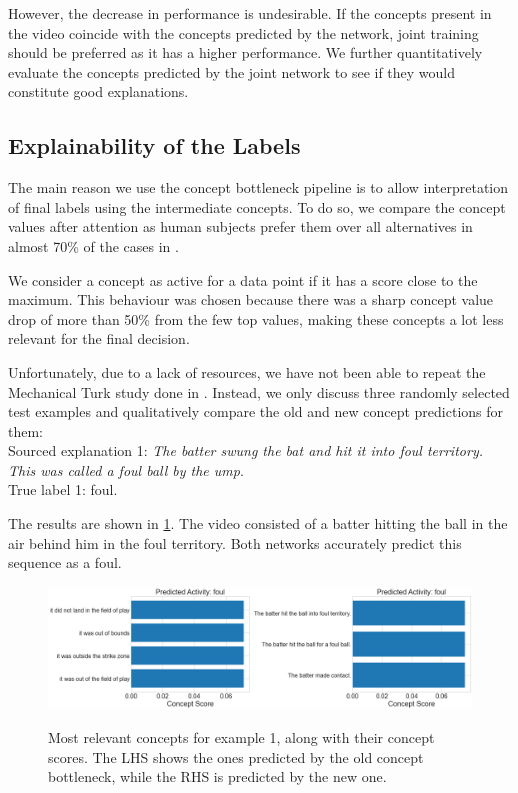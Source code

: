 However, the decrease in performance is undesirable.
If the concepts present in the video coincide with the concepts predicted by the network, joint training should be preferred as it has a higher performance.
We further quantitatively evaluate the concepts predicted by the joint network to see if they would constitute good explanations.

\subsection{Explainability of the Labels}



The main reason we use the concept bottleneck pipeline is to allow interpretation of final labels using the intermediate concepts.
To do so, we compare the concept values after attention as human subjects prefer them over all alternatives in almost 70\% of the cases in \cite{RefWorks:RefID:16-2021automatic}.

We consider a concept as active for a data point if it has a score close to the maximum.
This behaviour was chosen because there was a sharp concept value drop of more than 50\% from the few top values, making these concepts a lot less relevant for the final decision.


Unfortunately, due to a lack of resources, we have not been able to repeat the Mechanical Turk study done in \cite{RefWorks:RefID:16-2021automatic}. 
Instead, we only discuss three randomly selected test examples and qualitatively compare the old and new concept predictions for them: \\


Sourced explanation 1: \emph{The batter swung the bat and hit it into foul territory. This was called a foul ball by the ump}. \\
True label 1: foul.

The results are shown in \ref{concepts-results-1}.
The video consisted of a batter hitting the ball in the air behind him in the foul territory.
Both networks accurately predict this sequence as a foul.

\begin{figure}[h]
\caption{Most relevant concepts for example 1, along with their concept scores. The LHS shows the ones predicted by the old concept bottleneck, while the RHS is predicted by the new one.}
\centering
\includegraphics[width=\textwidth]{concept-bottleneck-pipeline/explanations_concepts1.png}
\label{concepts-results-1}
\end{figure}

